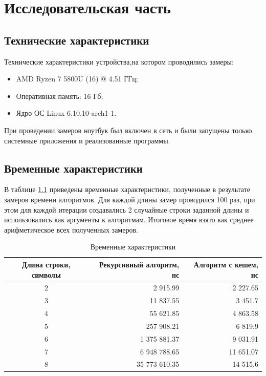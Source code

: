 \chapter{Исследовательская часть}

\section{Технические характеристики}

Технические характеристики устройства,на котором проводились замеры:

\begin{itemize}
	\item AMD Ryzen 7 5800U (16) @ 4.51 ГГц;
	\item Оперативная память: 16 Гб;
	\item Ядро ОС Linux 6.10.10-arch1-1.
\end{itemize}

При проведении замеров ноутбук был включен в сеть и были запущены только системные приложения и реализованные программы.

\section{Временные характеристики}
В таблице \ref{tbl:time} приведены временные характеристики, полученные в результате замеров времени алгоритмов. Для каждой длины замер проводился 100 раз, при этом для каждой итерации создавались 2 случайные строки заданной длины и использовались как аргументы к алгоритмам. Итоговое время взято как среднее арифметическое всех полученных замеров.

\begin{table}[H]
	\small
	\begin{center}
		\begin{threeparttable}
			\caption{Временные характеристики}
			\begin{tabular}{|c|r|r|}
				\hline
				Длина строки, символы & Рекурсивный алгоритм, нс & Алгоритм с кешем, нс \\
				\hline
				2 & 2 915.99  & 2 227.65  \\
				\hline
				3 & 11 837.55  & 3 451.7  \\
				\hline
				4 & 55 621.85  & 4 863.58  \\
				\hline
				5 & 257 908.21  & 6 819.9  \\
				\hline
				6 & 1 375 881.37  & 9 031.91  \\
				\hline
				7 & 6 948 788.65  & 11 651.07  \\
				\hline
				8 & 35 773 610.35  & 14 515.6  \\
				\hline
			\end{tabular}
                \label{tbl:time}
		\end{threeparttable}
	\end{center}
\end{table}

